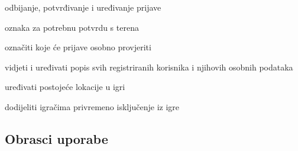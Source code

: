 \begin{packed_enum}
\begin{packed_enum}
			        \begin{packed_enum}
			            
			            \item odbijanje, potvrđivanje i uređivanje prijave
			            \item oznaka za potrebnu potvrdu s terena
			          
			        \end{packed_enum}
			        
			        \item označiti koje će prijave osobno provjeriti
			        
			    \end{packed_enum}
			    
		    \item {}
		    
		        \begin{packed_enum}
		            
		            \item vidjeti i uređivati popis svih registriranih korisnika i njihovih osobnih podataka
		            \item uređivati postojeće lokacije u igri
		            \item dodijeliti igračima privremeno isključenje iz igre
		            
		        \end{packed_enum}
		        
	        \item {}
		    
		        \begin{packed_enum}
		            
		            \item 
		            
		        \end{packed_enum}
		        
			\end{packed_enum}
			
			\eject 
			
			
				
			\subsection{Obrasci uporabe}
				
